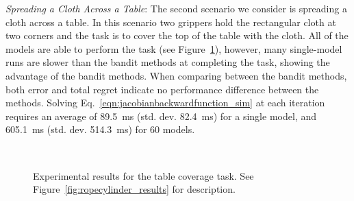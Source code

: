 \textit{Spreading a Cloth Across a Table}: The second scenario we consider is spreading a cloth across a table. In this scenario two grippers hold the rectangular cloth at two corners and the task is to cover the top of the table with the cloth. All of the models are able to perform the task (see Figure~\ref{fig:clothtable_results}), however, many single-model runs are slower than the bandit methods at completing the task, showing the advantage of the bandit methods. When comparing between the bandit methods, both error and total regret indicate no performance difference between the methods. Solving Eq.~\eqref{eqn:jacobianbackwardfunction_sim} at each iteration requires an average of 89.5~ms (std. dev. 82.4~ms) for a single model, and 605.1~ms (std. dev. 514.3~ms) for 60 models.


\begin{figure}[t]
    \centering
    \vspace{-0.1in}
    \\
    \vspace{-0.15in}
    \vspace{-0.1in}
    \caption{Experimental results for the table coverage task. See Figure~\ref{fig:ropecylinder_results} for description.}
    \label{fig:clothtable_results}
\end{figure}


